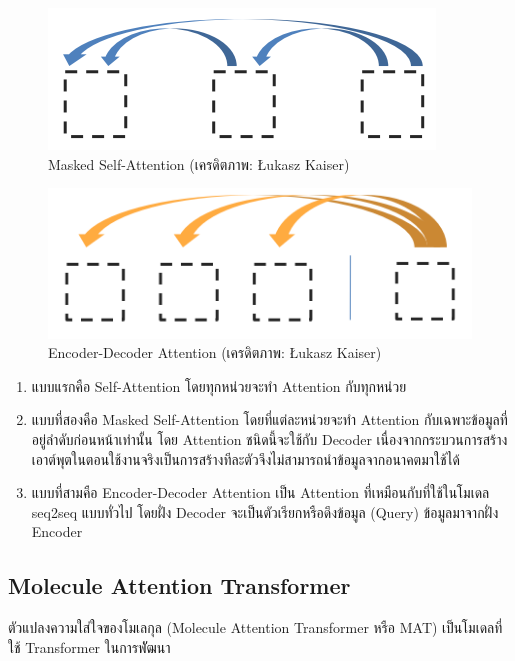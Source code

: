 \begin{figure}[htbp]
    \centering
    \includegraphics[width=0.6\linewidth]{fig/attention_2_masked.png}
    \caption{Masked Self-Attention (เครดิตภาพ: Łukasz Kaiser)}
    \label{fig:masked_self_attention}
\end{figure}

\begin{figure}[htbp]
    \centering
    \includegraphics[width=0.6\linewidth]{fig/attention_3_enc-dec.png}
    \caption{Encoder-Decoder Attention (เครดิตภาพ: Łukasz Kaiser)}
    \label{fig:enc_dec_attention}
\end{figure}

\begin{enumerate}
    \item แบบแรกคือ Self-Attention โดยทุกหน่วยจะทำ Attention กับทุกหน่วย

    \item แบบที่สองคือ Masked Self-Attention โดยที่แต่ละหน่วยจะทำ Attention กับเฉพาะข้อมูลที่อยู่ลำดับก่อนหน้าเท่านั้น โดย Attention 
    ชนิดนี้จะใช้กับ Decoder เนื่องจากกระบวนการสร้างเอาต์พุตในตอนใช้งานจริงเป็นการสร้างทีละตัวจึงไม่สามารถนำข้อมูลจากอนาคตมาใช้ได้

    \item แบบที่สามคือ Encoder-Decoder Attention เป็น Attention ที่เหมือนกับที่ใช้ในโมเดล seq2seq แบบทั่วไป โดยฝั่ง Decoder 
    จะเป็นตัวเรียกหรือดึงข้อมูล (Query) ข้อมูลมาจากฝั่ง Encoder
\end{enumerate}

\subsection{Molecule Attention Transformer}
\label{ssec:mol_transformer}

ตัวแปลงความใส่ใจของโมเลกุล (Molecule Attention Transformer หรือ MAT)\autocite{maziarka2020} เป็นโมเดลที่ใช้ Transformer
ในการพััฒนา

